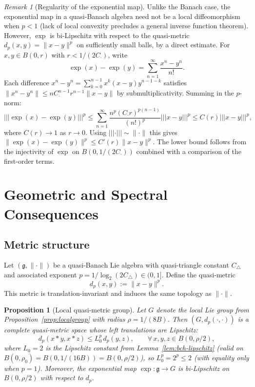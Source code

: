 \documentclass[10pt]{amsart}
\newtheorem{proposition}[theorem]{Proposition}
\theoremstyle{definition}
\theoremstyle{remark}
\newtheorem{remark}[theorem]{Remark}
\numberwithin{equation}{section}
\newcommand{\Ctri}{C_{\triangle}}    %
\newcommand{\Cmult}{C_{\cdot}}       %
\newcommand{\Cbracket}{B}            %
\newcommand{\pnorm}[1]{\left\vert\!\left\vert\!\left\vert #1 \right\vert\!\right\vert\!\right\vert} %
\newcommand{\dpmet}[2]{d_p(#1,#2)}   %
\begin{document}
\begin{remark}[Regularity of the exponential map]\label{rem:exp-regularity}
Unlike the Banach case, the exponential map in a quasi-Banach algebra need not be a local
diffeomorphism when $p<1$ (lack of local convexity precludes a general inverse function
theorem).  However, $\exp$ is bi-Lipschitz with respect to the quasi-metric
$\dpmet{x}{y} = \|x-y\|^p$ on sufficiently small balls, by a direct estimate.  For
$x, y \in B(0, r)$ with $r < 1/(2\Cmult)$, write
\[
  \exp(x) - \exp(y) = \sum_{n=1}^\infty \frac{x^n - y^n}{n!}.
\]
Each difference $x^n - y^n = \sum_{k=0}^{n-1} x^k(x-y)y^{n-1-k}$ satisfies
$\|x^n-y^n\| \le n\Cmult^{n-1}r^{n-1}\|x-y\|$ by submultiplicativity.  Summing in the
$p$-norm:
\[
  \pnorm{\exp(x)-\exp(y)}^p
  \le \sum_{n=1}^\infty \frac{n^p(\Cmult r)^{p(n-1)}}{(n!)^p}\pnorm{x-y}^p
  \le C(r)\pnorm{x-y}^p,
\]
where $C(r) \to 1$ as $r\to 0$.  Using $\pnorm{\cdot} \sim \|\cdot\|$ this gives
$\|\exp(x)-\exp(y)\|^p \le C'(r)\|x-y\|^p$.  The lower bound follows from the
injectivity of $\exp$ on $B(0,1/(2\Cmult))$ combined with a comparison of the
first-order terms.
\end{remark}

\section{Geometric and Spectral Consequences}\label{sec:geometry}

\subsection{Metric structure}

Let $(\mathfrak{g},\|\cdot\|)$ be a quasi-Banach Lie algebra with quasi-triangle constant
$\Ctri$ and associated exponent $p = 1/\log_2(2\Ctri)\in(0,1]$.  Define the quasi-metric
\[
  \dpmet{x}{y} := \|x-y\|^p.
\]
This metric is translation-invariant and induces the same topology as $\|\cdot\|$.

\begin{proposition}[Local quasi-metric group]\label{prop:quasimetric}
Let $G$ denote the local Lie group from Proposition~\ref{prop:localgroup} with radius
$\rho = 1/(8\Cbracket)$.  Then $(G,\dpmet{\cdot}{\cdot})$ is a complete quasi-metric
space whose left translations are Lipschitz:
\[
  \dpmet{x*y}{x*z} \le L_0^p \, \dpmet{y}{z}, \qquad
  \forall\, x,y,z\in B(0,\rho/2),
\]
where $L_0 = 2$ is the Lipschitz constant from Lemma~\ref{lem:bch-lipschitz} (valid on
$B(0,\rho_0) = B(0, 1/(16\Cbracket)) = B(0,\rho/2)$), so $L_0^p = 2^p \le 2$ (with
equality only when $p=1$).
Moreover, the exponential map $\exp:\mathfrak{g}\to G$ is bi-Lipschitz on $B(0,\rho/2)$
with respect to $d_p$.
\end{proposition}
\end{document}
